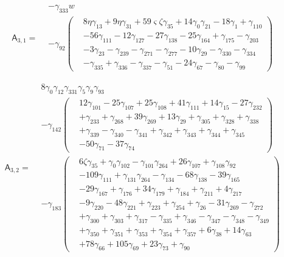 \[\mathsf A_{3,1}=\begin{aligned}&- \gamma_{333} w\\&- \gamma_{92} \left(\begin{aligned}& 8 \eta  \gamma_{13}+ 9 \eta  \gamma_{31}+ 59 \varsigma  \zeta  \gamma_{35}+ 14 \gamma_{0} \gamma_{21}- 18 \gamma_{1}+ \gamma_{110}\\&- 56 \gamma_{111}- 12 \gamma_{127}- 27 \gamma_{138}- 25 \gamma_{164}+ \gamma_{175}- \gamma_{203}\\&- 3 \gamma_{23}- \gamma_{239}- \gamma_{271}- \gamma_{277}- 10 \gamma_{29}- \gamma_{330}- \gamma_{334}\\&- \gamma_{335}+ \gamma_{336}- \gamma_{337}- \gamma_{51}- 24 \gamma_{67}- \gamma_{80}- \gamma_{99}\end{aligned}\right)\end{aligned}\]

\[\mathsf A_{3,2}=\begin{aligned}& 8 \gamma_{0} \gamma_{12} \gamma_{331} \gamma_{5} \gamma_{9} \gamma_{93}\\&- \gamma_{142} \left(\begin{aligned}& 12 \gamma_{101}- 25 \gamma_{107}+ 25 \gamma_{108}+ 41 \gamma_{111}+ 14 \gamma_{15}- 27 \gamma_{232}\\&+ \gamma_{233}+ \gamma_{268}+ 39 \gamma_{269}+ 13 \gamma_{29}+ \gamma_{305}+ \gamma_{328}+ \gamma_{338}\\&+ \gamma_{339}- \gamma_{340}- \gamma_{341}+ \gamma_{342}+ \gamma_{343}+ \gamma_{344}+ \gamma_{345}\\&- 50 \gamma_{71}- 37 \gamma_{74}\end{aligned}\right)\\&- \gamma_{183} \left(\begin{aligned}& 6 \zeta  \gamma_{35}+ \gamma_{0} \gamma_{102}- \gamma_{101} \gamma_{264}+ 26 \gamma_{107}+ \gamma_{108} \gamma_{92}\\&- 109 \gamma_{111}+ \gamma_{131} \gamma_{264}- \gamma_{134}- 68 \gamma_{138}- 39 \gamma_{165}\\&- 29 \gamma_{167}+ \gamma_{176}+ 34 \gamma_{179}+ \gamma_{184}+ \gamma_{211}+ 4 \gamma_{217}\\&- 9 \gamma_{220}- 48 \gamma_{221}+ \gamma_{223}+ \gamma_{254}+ \gamma_{26}- 31 \gamma_{269}- \gamma_{272}\\&+ \gamma_{300}+ \gamma_{303}+ \gamma_{317}- \gamma_{335}+ \gamma_{346}- \gamma_{347}- \gamma_{348}- \gamma_{349}\\&+ \gamma_{350}+ \gamma_{351}+ \gamma_{353}+ \gamma_{354}+ \gamma_{357}+ 6 \gamma_{38}+ 14 \gamma_{63}\\&+ 78 \gamma_{66}+ 105 \gamma_{69}+ 23 \gamma_{73}+ \gamma_{90}\end{aligned}\right)\end{aligned}\]

